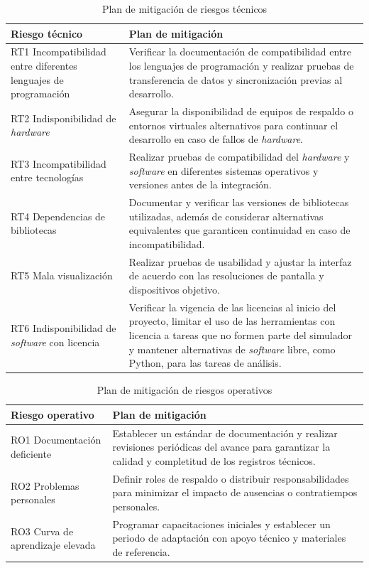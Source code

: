 \begin{table}[H]
	\centering
	\renewcommand{\arraystretch}{1.2}
	\setlength{\tabcolsep}{4pt}
	\begin{tabular}{|p{}|p{}|}
		\hline
		\textbf{Riesgo técnico} & \textbf{Plan de mitigación} \\ \hline
		RT1 Incompatibilidad entre diferentes lenguajes de programación & Verificar la documentación de compatibilidad entre los lenguajes de programación y realizar pruebas de transferencia de datos y sincronización previas al desarrollo. \\ \hline
		RT2 Indisponibilidad de \textit{hardware} & Asegurar la disponibilidad de equipos de respaldo o entornos virtuales alternativos para continuar el desarrollo en caso de fallos de \textit{hardware}. \\ \hline
		RT3 Incompatibilidad entre tecnologías & Realizar pruebas de compatibilidad del \textit{hardware} y \textit{software} en diferentes sistemas operativos y versiones antes de la integración. \\ \hline
		RT4 Dependencias de bibliotecas & Documentar y verificar las versiones de bibliotecas utilizadas, además de considerar alternativas equivalentes que garanticen continuidad en caso de incompatibilidad. \\ \hline
		RT5 Mala visualización & Realizar pruebas de usabilidad y ajustar la interfaz de acuerdo con las resoluciones de pantalla y dispositivos objetivo. \\ \hline
		RT6 Indisponibilidad de \textit{software} con licencia & Verificar la vigencia de las licencias al inicio del proyecto, limitar el uso de las herramientas con licencia a tareas que no formen parte del simulador y mantener alternativas de \textit{software} libre, como Python, para las tareas de análisis. \\ \hline
	\end{tabular}
	\caption{Plan de mitigación de riesgos técnicos}
	\label{table:mitigacion_tecnico}
\end{table}

\begin{table}[H]
	\centering
	\renewcommand{\arraystretch}{1.2}
	\setlength{\tabcolsep}{4pt}
	\begin{tabular}{|p{}|p{}|}
		\hline
		\textbf{Riesgo operativo} & \textbf{Plan de mitigación} \\ \hline
		RO1 Documentación deficiente & Establecer un estándar de documentación y realizar revisiones periódicas del avance para garantizar la calidad y completitud de los registros técnicos. \\ \hline
		RO2 Problemas personales & Definir roles de respaldo o distribuir responsabilidades para minimizar el impacto de ausencias o contratiempos personales. \\ \hline
		RO3 Curva de aprendizaje elevada & Programar capacitaciones iniciales y establecer un periodo de adaptación con apoyo técnico y materiales de referencia. \\ \hline
	\end{tabular}
	\caption{Plan de mitigación de riesgos operativos}
	\label{table:mitigacion_operativo}
\end{table}

